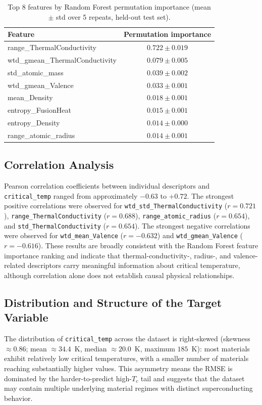 \documentclass[11pt]{article}
\begin{document}
\begin{table}[htbp]
\centering
\caption{Top 8 features by Random Forest permutation importance (mean $\pm$ std over 5 repeats,
held-out test set).}
\label{tab:perm}
\begin{tabular}{l c}
\toprule
\textbf{Feature} & \textbf{Permutation importance} \\
\midrule
range\_ThermalConductivity        & $0.722 \pm 0.019$ \\
wtd\_gmean\_ThermalConductivity   & $0.079 \pm 0.005$ \\
std\_atomic\_mass                 & $0.039 \pm 0.002$ \\
wtd\_gmean\_Valence               & $0.033 \pm 0.001$ \\
mean\_Density                     & $0.018 \pm 0.001$ \\
entropy\_FusionHeat               & $0.015 \pm 0.001$ \\
entropy\_Density                  & $0.014 \pm 0.000$ \\
range\_atomic\_radius             & $0.014 \pm 0.001$ \\
\bottomrule
\end{tabular}
\end{table}

\subsection{Correlation Analysis}
Pearson correlation coefficients between individual descriptors and \texttt{critical\_temp} ranged from
approximately $-0.63$ to $+0.72$. The strongest positive correlations were observed for
\texttt{wtd\_std\_ThermalConductivity} ($r=0.721$), \texttt{range\_ThermalConductivity} ($r=0.688$),
\texttt{range\_atomic\_radius} ($r=0.654$), and \texttt{std\_ThermalConductivity} ($r=0.654$). The
strongest negative correlations were observed for \texttt{wtd\_mean\_Valence} ($r=-0.632$) and
\texttt{wtd\_gmean\_Valence} ($r=-0.616$). These results are broadly consistent with the Random Forest
feature importance ranking and indicate that thermal-conductivity-, radius-, and valence-related
descriptors carry meaningful information about critical temperature, although correlation alone does not
establish causal physical relationships.

\subsection{Distribution and Structure of the Target Variable}
The distribution of \texttt{critical\_temp} across the dataset is right-skewed (skewness $\approx 0.86$;
mean $\approx 34.4$~K, median $\approx 20.0$~K, maximum $185$~K): most materials exhibit relatively low
critical temperatures, with a smaller number of materials reaching substantially higher values. This
asymmetry means the RMSE is dominated by the harder-to-predict high-$T_c$ tail and suggests that the
dataset may contain multiple underlying material regimes with distinct superconducting behavior.
\end{document}
